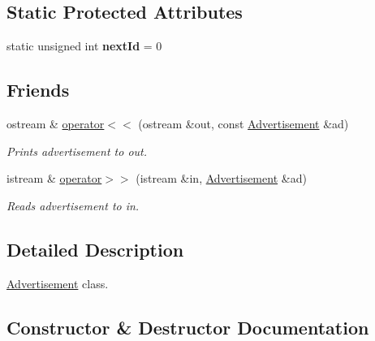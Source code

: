 \subsection*{Static Protected Attributes}
\begin{DoxyCompactItemize}
\item 
\hypertarget{class_advertisement_a0b5a0f2ec778aba63d0dd24bb3b2675b}{}static unsigned int {\bfseries next\+Id} = 0\label{class_advertisement_a0b5a0f2ec778aba63d0dd24bb3b2675b}

\end{DoxyCompactItemize}
\subsection*{Friends}
\begin{DoxyCompactItemize}
\item 
ostream \& \hyperlink{class_advertisement_a4286d9a94fa7c907d6a5bad538a8527b}{operator$<$$<$} (ostream \&out, const \hyperlink{class_advertisement}{Advertisement} \&ad)
\begin{DoxyCompactList}\small\item\em Prints advertisement to out. \end{DoxyCompactList}\item 
istream \& \hyperlink{class_advertisement_a5180e86255ebd01c83666f431b910bb4}{operator$>$$>$} (istream \&in, \hyperlink{class_advertisement}{Advertisement} \&ad)
\begin{DoxyCompactList}\small\item\em Reads advertisement to in. \end{DoxyCompactList}\end{DoxyCompactItemize}


\subsection{Detailed Description}
\hyperlink{class_advertisement}{Advertisement} class. 

\subsection{Constructor \& Destructor Documentation}
\hypertarget{class_advertisement_aa39584aae7c125c74a9dfe97409ae326}{}
